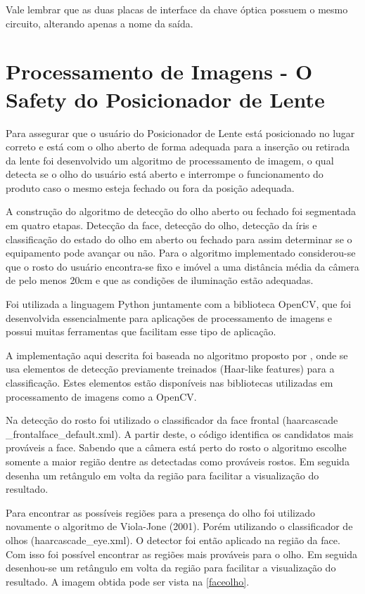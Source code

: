 Vale lembrar que as duas placas de interface da chave óptica possuem o mesmo circuito, alterando apenas a nome da saída.

\section[Processamento de Imagens - O Safety do Posicionador de Lente]{Processamento de Imagens - O Safety do Posicionador de Lente}

Para assegurar que o usuário do Posicionador de Lente está posicionado no lugar correto e está com o olho aberto de forma adequada para a inserção ou retirada da lente foi desenvolvido um algoritmo de processamento de imagem, o qual detecta se o olho do usuário está aberto e interrompe o funcionamento do produto caso o mesmo esteja fechado ou fora da posição adequada.

A construção do algoritmo de detecção do olho aberto ou fechado foi segmentada em quatro etapas. Detecção da face, detecção do olho, detecção da íris e classificação do estado do olho em aberto ou fechado para assim determinar se o equipamento pode avançar ou não. Para o algoritmo implementado considerou-se que o rosto do usuário encontra-se fixo e imóvel a uma distância média da câmera de pelo menos 20cm e que as condições de iluminação estão adequadas.

Foi utilizada a linguagem Python juntamente com a biblioteca OpenCV, que foi desenvolvida essencialmente para aplicações de processamento de imagens e possui muitas ferramentas que facilitam esse tipo de aplicação. 

A implementação aqui descrita foi baseada no algoritmo proposto por , onde se usa elementos de detecção previamente treinados (Haar-like features) para a classificação. Estes elementos estão disponíveis nas bibliotecas utilizadas em processamento de imagens como a OpenCV. 

Na detecção do rosto foi utilizado o classificador da face frontal (haarcascade \_frontalface\_default.xml). A partir deste, o código identifica os candidatos mais prováveis a face. Sabendo que a câmera está perto do rosto o algoritmo escolhe somente a maior região dentre as detectadas como prováveis rostos. Em seguida desenha um retângulo em volta da região para facilitar a visualização do resultado. 

Para encontrar as possíveis regiões para a presença do olho foi utilizado novamente o algoritmo de Viola-Jone (2001). Porém utilizando o classificador de olhos (haarcascade\_eye.xml). O detector foi então aplicado na região da face. Com isso foi possível encontrar as regiões mais prováveis para o olho. Em seguida desenhou-se um retângulo em volta da região para facilitar a visualização do resultado.  A imagem obtida pode ser vista na \ref{faceolho}.

